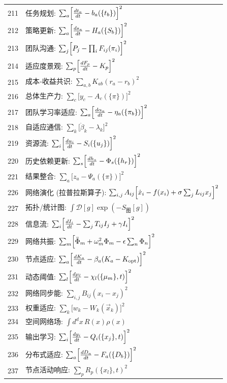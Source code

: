 \documentclass[11pt,a4paper]{article}
\begin{document}
\begin{longtable}{r l}
		211 & 任务规划: $\sum_a\Bigl[\frac{dt_a}{dt} - b_a(\{t_b\})\Bigr]^2$ \\
		212 & 策略更新: $\sum_a\Bigl[\frac{ds_a}{dt} - H_a(\{S_b\})\Bigr]^2$ \\
		213 & 团队沟通: $\sum_j\Bigl[P_j - \prod_i F_{ij}(\pi_i)\Bigr]^2$ \\
		214 & 适应度景观: $\sum_p\Bigl[\frac{dF_p}{dt} - K_p\Bigr]^2$ \\
		215 & 成本‑收益共识: $\sum_{a,b}K_{ab}(r_a - r_b)^2$ \\
		216 & 总体生产力: $\sum_c\bigl[y_c - A_c(\{\pi\})\bigr]^2$ \\
		217 & 团队学习率适应: $\sum_a\Bigl[\frac{d\alpha_a}{dt} - \eta_a(\{\pi_b\})\Bigr]^2$ \\
		218 & 自适应通信: $\sum_k\bigl[\dot\beta_k - \lambda_k\bigr]^2$ \\
		219 & 资源流: $\sum_i\Bigl[\frac{du_i}{dt} - S_i(\{u_j\})\Bigr]^2$ \\
		220 & 历史依赖更新: $\sum_s\Bigl[\frac{dh_s}{dt} - \Phi_s(\{h_r\})\Bigr]^2$ \\
		221 & 结果整合: $\sum_a\bigl[z_a - \Psi_a(\{\pi\})\bigr]^2$ \\
		226 & 网络演化 (拉普拉斯算子): $\sum_{i,j}A_{ij}\Bigl[\dot x_i - f(x_i) + \sigma\sum_j L_{ij}x_j\Bigr]^2$ \\
		227 & 拓扑/统计图: $\int\mathcal{D}[g]\exp(-S_{\text{图}}[g])$ \\
		228 & 信息流: $\sum_i\Bigl[\frac{dI_i}{dt} - \sum_j T_{ij}I_j + \gamma I_i\Bigr]^2$ \\
		229 & 网络共振: $\sum_m\Bigl[\ddot\Phi_m + \omega_m^2\Phi_m - \epsilon\sum_n\Phi_n\Bigr]^2$ \\
		230 & 节点适应: $\sum_a\Bigl[\frac{dK_a}{dt} - \beta_a(K_a - K_{\text{opt}})\Bigr]^2$ \\
		231 & 动态阈值: $\sum_l\Bigl[\frac{d\mu_l}{dt} - \chi_l(\{\mu_m\},t)\Bigr]^2$ \\
		232 & 网络同步能: $\sum_{i,j}B_{ij}(x_i - x_j)^2$ \\
		233 & 权重适应: $\sum_k\bigl[w_k - W_k(\vec x_k)\bigr]^2$ \\
		234 & 空间网络场: $\int d^dx\,R(x)\rho(x)$ \\
		235 & 输出学习: $\sum_i\Bigl[\frac{dy_i}{dt} - Q_i(\{x_j\},t)\Bigr]^2$ \\
		236 & 分布式适应: $\sum_a\Bigl[\frac{dD_a}{dt} - F_a(\{D_b\})\Bigr]^2$ \\
		237 & 节点活动响应: $\sum_p R_p(\{x_l\},t)^2$ \\

\end{longtable}
\end{document}
